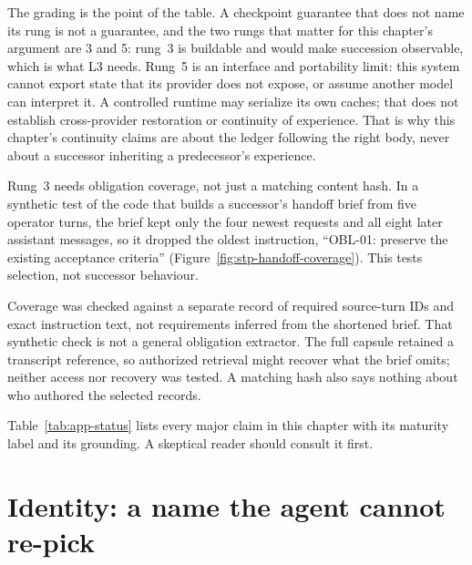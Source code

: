 \documentclass[11pt,a4paper]{article}
\theoremstyle{definition}
\begin{document}
The grading is the point of the table. A checkpoint guarantee that does not name
its rung is not a guarantee, and the two rungs that matter for this chapter's
argument are 3 and 5: rung~3 is buildable and would make succession observable,
which is what L3 needs. Rung~5 is an interface and portability limit: this system
cannot export state that its provider does not expose, or assume another model
can interpret it. A controlled runtime may serialize its own caches; that does
not establish cross-provider restoration or continuity of experience.
That is why this chapter's continuity claims are about the ledger
following the right body, never about a successor inheriting a predecessor's
experience.

Rung~3 needs obligation coverage, not just a matching content hash. In a synthetic
test of the code that builds a successor's handoff brief from five operator
turns, the brief kept only the four newest requests and all eight later
assistant messages, so it dropped the oldest instruction, ``OBL-01: preserve
the existing acceptance criteria'' (Figure~\ref{fig:stp-handoff-coverage}). This tests selection, not successor
behaviour.


\FloatBarrier

Coverage was checked against a separate record of required source-turn IDs
and exact instruction text, not requirements inferred from the shortened
brief. That synthetic check is not a general obligation extractor. The full
capsule retained a transcript reference, so authorized retrieval might recover
what the brief omits; neither access nor recovery was tested. A matching hash
also says nothing about who authored the selected records.

\noindent Table~\ref{tab:app-status} lists every major claim in this chapter
with its maturity label and its grounding. A skeptical reader should consult
it first.


\pdexercisepointer{\ref{ex:stp-weak-organ}}{\ref{ex:stp-death-taxonomy}}{\pageref{ex:stp-weak-organ}}


\section{Identity: a name the agent cannot re-pick}\label{sec:identity}
\end{document}
